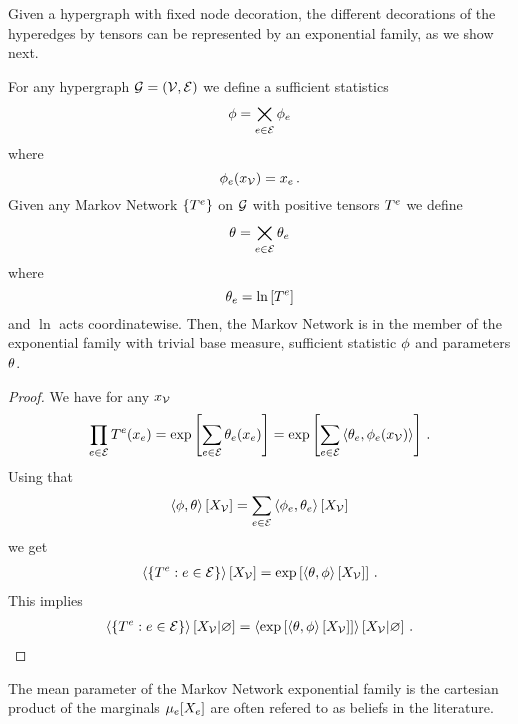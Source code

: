 Given a hypergraph with fixed node decoration, the different decorations of the hyperedges by tensors can be represented by an exponential family, as we show next.

\begin{theorem}
	For any hypergraph $\mathcal{G}=(\mathcal{V},\mathcal{E})$ we define a sufficient statistics 
		\[ \phi = \bigtimes_{e\in\mathcal{E}}  \phi_{e} \]
	where 
		\[ \phi_{e}(x_{\mathcal{V}}) = x_{e} \, . \]
	Given any Markov Network $\{T^{e}\}$ on $\mathcal{G}$ with positive tensors $T^{e}$ we define
		\[ \theta = \bigtimes_{e\in\mathcal{E}} \theta_{e} \]
	where
		\[ \theta_{e} =  \ln\left[ T^{e} \right] \]
	and $\ln$ acts coordinatewise.
	Then, the Markov Network is in the member of the exponential family with trivial base measure, sufficient statistic $\phi$ and parameters $\theta$.
\end{theorem}
\begin{proof}
	We have for any $x_{\mathcal{V}}$
	\begin{align}
	\prod_{e\in\mathcal{E}} T^{e} (x_{e}) 
		= \mathrm{exp}\left[\sum_{e\in\mathcal{E}} \theta_{e}(x_{e})\right]
		= \mathrm{exp}\left[\sum_{e\in\mathcal{E}} \braket{\theta_{e},\phi_{e}(x_{\mathcal{V}})}\right]  \, .
	\end{align}
	Using that
		\[ \left\langle \phi,\theta\right\rangle \left[ X_{\mathcal{V}} \right] = \sum_{e\in\mathcal{E}} \left\langle \phi_{e},\theta_{e}\right\rangle \left[ X_{\mathcal{V}} \right] \]
	we get
	\begin{align}
		\left\langle \{T^{e}: e\in\mathcal{E}\}\right\rangle \left[ X_{\mathcal{V}} \right] = \mathrm{exp}\left[\left\langle \theta,\phi\right\rangle \left[ X_{\mathcal{V}} \right]\right] \, .
	\end{align}
	This implies 
	\begin{align}
		\left\langle \{T^{e}: e\in\mathcal{E}\}\right\rangle \left[ X_{\mathcal{V}} | \varnothing \right] = \left\langle \mathrm{exp}\left[\left\langle \theta,\phi\right\rangle \left[ X_{\mathcal{V}} \right]\right]\right\rangle \left[ X_{\mathcal{V}} | \varnothing \right] \, .
	\end{align}
\end{proof}


The mean parameter of the Markov Network exponential family is the cartesian product of the marginals $\mu_e[X_{e}]$ are often refered to as beliefs in the literature.



